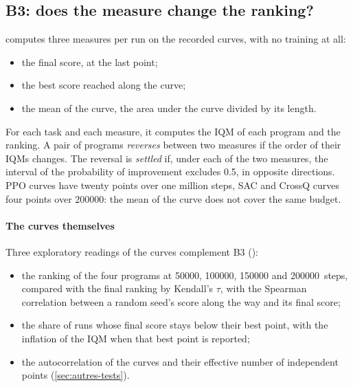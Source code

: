 \subsection{B3: does the measure change the ranking?}\label{sec:plan-b3}
 computes three measures per run on the recorded curves, with no training at all:
\begin{itemize}
  \item the final score, at the last point;
  \item the best score reached along the curve;
  \item the mean of the curve, the area under the curve divided by its length.
\end{itemize}
For each task and each measure, it computes the IQM of each program and the ranking. A pair of programs
\emph{reverses} between two measures if the order of their IQMs changes. The reversal is \emph{settled}
if, under each of the two measures, the interval of the probability of improvement excludes 0.5, in opposite
directions. PPO curves have twenty points over one million steps, SAC and CrossQ curves four points over
\num{200000}: the mean of the curve does not cover the same budget.

\paragraph{The curves themselves}
Three exploratory readings of the curves complement B3
():
\begin{itemize}
  \item the ranking of the four programs at \num{50000}, \num{100000}, \num{150000} and \num{200000}~steps,
    compared with the final ranking by Kendall's $\tau$, with the Spearman correlation between a random seed's
    score along the way and its final score;
  \item the share of runs whose final score stays below their best point, with the inflation of the IQM when
    that best point is reported;
  \item the autocorrelation of the curves and their effective number of independent points
    (\cref{sec:autres-tests}).
\end{itemize}

